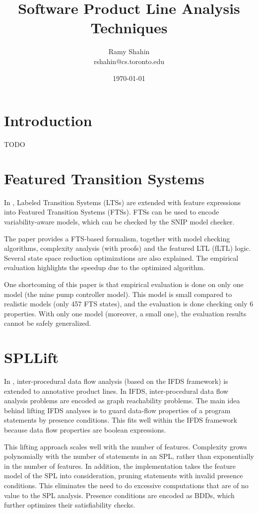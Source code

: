 \documentclass[11pt]{article}
\title{Software Product Line Analysis Techniques}
\author{Ramy Shahin \\ rshahin@cs.toronto.edu}
\date{\today}                                           %
\begin{document}
\maketitle


\section{Introduction}
TODO

\section{Featured Transition Systems}
\cite{Classen:2013}

In \cite{Classen:2013}, Labeled Transition Systems (LTSs) are extended with feature expressions into Featured Transition Systems (FTSs). FTSs can be used to encode variability-aware models, which can be checked by the SNIP model checker. 

The paper provides a FTS-based formalism, together with model checking algorithms, complexity analysis (with proofs) and the featured LTL (fLTL) logic. Several state space reduction optimizations are also explained. The empirical evaluation highlights the speedup due to the optimized algorithm.

One shortcoming of this paper is that empirical evaluation is done on only one model (the mine pump controller model). This model is small compared to realistic models (only 457 FTS states), and the evaluation is done checking only 6 properties. With only one model (moreover, a small one), the evaluation results cannot be safely generalized. 
 
\section{SPLLift}

In \cite{Bodden:2013}, inter-procedural data flow analysis (based on the IFDS \cite{Reps:1995} framework) is extended to annotative product lines. In IFDS, inter-procedural data flow analysis problems are encoded as graph reachability problems. The main idea behind lifting IFDS analyses is to guard data-flow properties of a program statements by presence conditions. This fits well within the IFDS framework because data flow properties are boolean expressions.

This lifting approach scales well with the number of features. Complexity grows polynomially with the number of statements in an SPL, rather than exponentially in the number of features. In addition, the implementation takes the feature model of the SPL into consideration, pruning statements with invalid presence conditions. This eliminates the need to do excessive computations that are of no value to the SPL analysis. Presence conditions are encoded as BDDs, which further optimizes their satisfiability checks.
\end{document}

